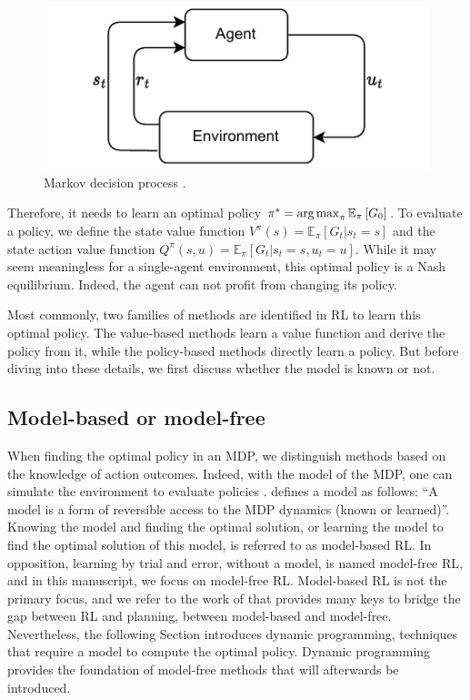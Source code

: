 \begin{figure}
    \centering
    \includegraphics[width=.8\linewidth]{tex_thesis/figures/ch2/MDP.pdf}
    \caption{Markov decision process \citep{sutton2018reinforcement}.}
    \label{fig:ch2_mdp}
\end{figure}


Therefore, it needs to learn an optimal policy $\pi^*=\operatorname*{arg\,max}_\pi \mathbb{E}_{\pi}\left[ G_0 \right]$.
To evaluate a policy, we define the state value function $V^\pi(s) = \mathbb{E}_{\pi}\left[G_t|s_t=s\right]$ and the state action value function $Q^\pi(s, u) = \mathbb{E}_{\pi}\left[G_t|s_t=s, u_t=u\right]$.
While it may seem meaningless for a single-agent environment, this optimal policy is a Nash equilibrium.
Indeed, the agent can not profit from changing its policy.

Most commonly, two families of methods are identified in RL to learn this optimal policy.
The value-based methods learn a value function and derive the policy from it, while the policy-based methods directly learn a policy.
But before diving into these details, we first discuss whether the model is known or not.

\subsection{Model-based or model-free}
\label{sec:ch2_model_based_vs_model_free}

When finding the optimal policy in an MDP, we distinguish methods based on the knowledge of action outcomes.
Indeed, with the model of the MDP, one can simulate the environment to evaluate policies \citep{sutton2018reinforcement}.
\cite{moerland2023model} defines a model as follows: ``A model is a form of reversible access to the MDP dynamics (known or learned)''.
Knowing the model and finding the optimal solution, or learning the model to find the optimal solution of this model, is referred to as model-based RL.
In opposition, learning by trial and error, without a model, is named model-free RL, and in this manuscript, we focus on model-free RL.
Model-based RL is not the primary focus, and we refer to the work of \cite{moerland2023model} that provides many keys to bridge the gap between RL and planning, between model-based and model-free.
Nevertheless, the following Section introduces dynamic programming, techniques that require a model to compute the optimal policy.
Dynamic programming provides the foundation of model-free methods that will afterwards be introduced.

